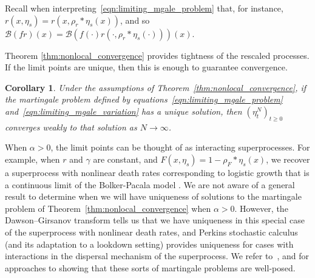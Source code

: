 \documentclass[12pt]{article}
\newtheorem{corollary}[theorem]{Corollary}
\newcommand{\DG}{\mathcal{B}}  %
\newcommand{\kernel}{\rho}  %
\newcommand{\smooth}[1]{\kernel_{#1} \! * \!}  %
\numberwithin{equation}{section}
\begin{document}
Recall when interpreting~\eqref{eqn:limiting_mgale_problem}
that, for instance, $r(x, \eta_s) = r(x, \smooth{r} \eta_s(x))$,
and so $\DG(fr)(x) = \DG(f(\cdot) r(\cdot, \smooth{r} \eta_s(\cdot)))(x)$.


Theorem \ref{thm:nonlocal_convergence} provides tightness of the
rescaled processes. If the limit points are unique, then this
is enough to guarantee convergence.

\begin{corollary} \label{cor:superprocess_uniqueness}
    Under the assumptions of Theorem~\ref{thm:nonlocal_convergence},
    if the martingale problem
    defined by equations~\eqref{eqn:limiting_mgale_problem} 
and~\eqref{eqn:limiting_mgale_variation}
    has a unique solution,
    then $(\eta^N_t)_{t \ge 0}$ converges weakly
to that solution
    as $N \to \infty$.
\end{corollary}
When $\alpha>0$, the limit points can be thought of as interacting superprocesses. For
example, when $r$ and $\gamma$ are constant, and 
$F(x,\eta_s)=1-\smooth{F} \eta_s(x)$,
we recover a superprocess with nonlinear death rates corresponding to logistic growth
\citep{etheridge:2004}
that is a continuous limit of the Bolker-Pacala model \citep{bolker/pacala:1997,bolker/pacala:1999}.
We are not aware of a general result to determine when we will have uniqueness of 
solutions to the martingale problem of Theorem~\ref{thm:nonlocal_convergence}
when $\alpha>0$.
However, the Dawson--Girsanov transform tells us that we have uniqueness in this special 
case of the superprocess with nonlinear death rates, and 
Perkins stochastic calculus (and its adaptation to a 
lookdown setting) provides uniqueness for cases with interactions in the 
dispersal mechanism of
the superprocess. We refer 
to~\cite{dawson:1993, perkins:1992}, and \cite{donnelly/kurtz:1999} 
for approaches to showing that these sorts of martingale problems are well-posed.
\end{document}
